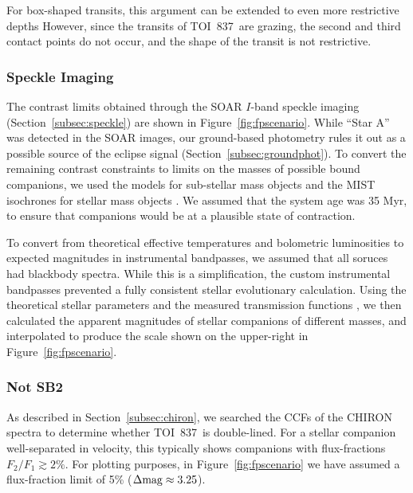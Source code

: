 \documentclass[12pt,twocolumn,tighten]{aastex63}
\newcommand{\tn}{TOI~837} %
\begin{document}
For box-shaped transits, this argument can be
extended to even more restrictive depths \citep[{\it
e.g.},][]{seager_unique_2003,vanderburg_hr858_2019,rizzuto_tess_2020}
However, since the transits of \tn\ are grazing, the second and third
contact points do not occur, and the shape of the transit is not
restrictive.

\subsubsection{Speckle Imaging}
The contrast limits obtained through the SOAR $I$-band speckle imaging
(Section~\ref{subsec:speckle}) are shown in
Figure~\ref{fig:fpscenario}.  While ``Star A'' was detected in the
SOAR images, our ground-based photometry rules it out as a possible
source of the eclipse signal (Section~\ref{subsec:groundphot}).  To
convert the remaining contrast constraints to limits on the masses of
possible bound companions, we used the
\citet{baraffe_evolutionary_2003} models for sub-stellar mass objects
and the MIST isochrones for stellar mass objects
\citep{paxton_modules_2011,paxton_modules_2013,paxton_modules_2015,dotter_mesa_2016,choi_mesa_2016}.
We assumed that the system age was 35 Myr, to ensure that companions
would be at a plausible state of contraction.

To convert from theoretical effective temperatures and bolometric
luminosities to expected magnitudes in instrumental bandpasses, we
assumed that all soruces had blackbody spectra.  While this is
a simplification, the custom instrumental bandpasses prevented a fully
consistent stellar evolutionary calculation.  Using the theoretical
stellar parameters and the measured transmission functions
\citep{tokovinin_ten_2018}, we then calculated the apparent magnitudes
of stellar companions of different masses, and interpolated
to produce the scale shown on the upper-right in
Figure~\ref{fig:fpscenario}.

\subsubsection{Not SB2}
As described in Section~\ref{subsec:chiron}, we searched the CCFs of
the CHIRON spectra to determine whether \tn\ is double-lined.  For a
stellar companion well-separated in velocity, this typically shows
companions with flux-fractions $F_2/F_1 \gtrsim 2\%$.  For plotting
purposes, in Figure~\ref{fig:fpscenario} we have assumed a
flux-fraction limit of 5\% ($\Delta {\rm mag} \approx 3.25$).
\end{document}
